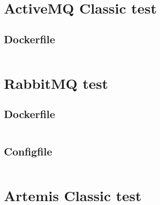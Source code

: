 \section{ActiveMQ Classic test}\label{sec:code_amq}
\subsection{Dockerfile}\label{sec:docker_amq}
\inputminted{python3}{../tests/messaging/activemq-server/Dockerfile}\label{listing:docker_amq}
 

\section{RabbitMQ test}\label{sec:code_rabbitmq}
\subsection{Dockerfile}\label{sec:docker_rabbitmq}
\inputminted{python3}{../tests/messaging/rabbitmq-server/Dockerfile}\label{listing:docker_rabbitmq}

\subsection{Configfile}\label{sec:config_rabbitmq}
\inputminted{python3}{../tests/messaging/rabbitmq-server/rabbitmq.conf}\label{listing:config_rabbitmq}

\section{Artemis Classic test}\label{sec:code_artemis}